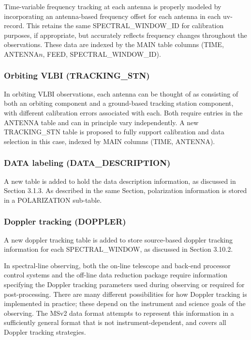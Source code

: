 \documentclass{article}
\begin{document}
Time-variable frequency tracking at each antenna is properly modeled
by incorporating an antenna-based frequency offset for each antenna in
each uv-record. This retains the same SPECTRAL\_WINDOW\_ID for
calibration purposes, if appropriate, but accurately reflects
frequency changes throughout the observations. These data are indexed
by the MAIN table columns (TIME, ANTENNA$n$, FEED,
SPECTRAL\_WINDOW\_ID).

\subsubsection{Orbiting VLBI (TRACKING\_STN)}

In orbiting VLBI observations, each antenna can be thought of as
consisting of both an orbiting component and a ground-based tracking
station component, with different calibration errors associated with
each. Both require entries in the ANTENNA table and can in principle
vary independently. A new TRACKING\_STN table is proposed to fully
support calibration and data selection in this case, indexed by MAIN
columns (TIME, ANTENNA).

\subsubsection{DATA labeling (DATA\_DESCRIPTION)}

A new table is added to hold the data description information, as
discussed in Section 3.1.3. As described in the same Section,
polarization information is stored in a POLARIZATION sub-table.

\subsubsection{Doppler tracking (DOPPLER)}
A new doppler tracking table is added to store source-based doppler
tracking information for each SPECTRAL\_WINDOW, as discussed in
Section 3.10.2.

In spectral-line observing, both the on-line telescope and back-end
processor control systems and the off-line data reduction package
require information specifying the Doppler tracking parameters used
during observing or required for post-processing. There are many
different possibilities for how Doppler tracking is implemented in
practice; these depend on the instrument and science goals of the
observing. The MSv2 data format attempts to represent this information
in a sufficiently general format that is not instrument-dependent, and
covers all Doppler tracking strategies.
\end{document}

